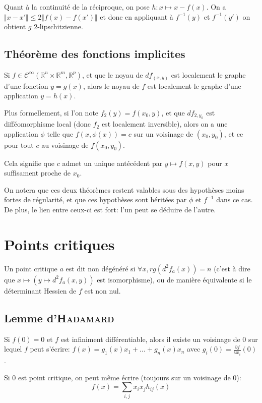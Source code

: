 \documentclass{article}
\begin{document}
Quant à la continuité de la réciproque, on pose $h:x\mapsto x-f(x)$. On a $\Vert x-x' \Vert\leq 2\Vert f(x) - f(x')\Vert$ et donc en appliquant à $f^{-1}(y)$ et $f^{-1}(y')$ on obtient $g$ 2-lipschitzienne.

\subsection{Théorème des fonctions implicites}

Si $f\in\mathcal{C}^{\infty}(\mathbb{R}^n\times\mathbb{R}^m,\mathbb{R}^p)$, et que le noyau de $df_{(x,y)}$ est localement le graphe d'une fonction $y=g(x)$, alors le noyau de $f$ est localement le graphe d'une application $y=h(x)$.

Plus formellement, si l'on note $f_2(y) = f(x_0, y)$, et que $df_{2,y_0}$ est difféomorphisme local (donc $f_2$ est localement inversible), alors on a une application $\phi$ telle que $f(x,\phi(x))=c$ sur un voisinage de $(x_0,y_0)$, et ce pour tout $c$ au voisinage de $f(x_0,y_0)$.

Cela signifie que $c$ admet un unique antécédent par $y\mapsto f(x,y)$ pour $x$ suffisament proche de $x_0$.

\bigskip

On notera que ces deux théorèmes restent valables sous des hypothèses moins fortes de régularité, et que ces hypothèses sont héritées par $\phi$ et $f^{-1}$ dans ce cas. De plus, le lien entre ceux-ci est fort: l'un peut se déduire de l'autre.

\section{Points critiques}

Un point critique $a$ est dit non dégénéré si $\forall x, rg(d^2f_a(x))=n$ (c'est à dire que $x\mapsto(y\mapsto d^2f_a(x,y))$ est isomorphisme), ou de manière équivalente si le déterminant Hessien de $f$ est non nul.

\subsection{Lemme d'\textsc{Hadamard}}

Si $f(0)=0$ et $f$ est infiniment différentiable, alors il existe un voisinage de 0 sur lequel $f$ peut s'écrire: $f(x)=g_1(x)x_1+...+g_n(x)x_n$ avec $g_i(0) = \frac{\partial f}{\partial x_i}(0)$.

Si 0 est point critique, on peut même écrire (toujours sur un voisinage de 0): $$f(x)=\sum_{i,j} x_ix_jh_{ij}(x)$$
\end{document}
